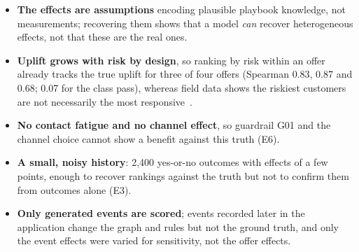 \begin{itemize}
  \item \textbf{The effects are assumptions} encoding plausible playbook knowledge, not measurements; recovering them shows that a model \emph{can} recover heterogeneous effects, not that these are the real ones.
  \item \textbf{Uplift grows with risk by design}, so ranking by risk within an offer already tracks the true uplift for three of four offers (Spearman 0.83, 0.87 and 0.68; 0.07 for the class pass), whereas field data shows the riskiest customers are not necessarily the most responsive~\cite{ascarza2018futility}.
  \item \textbf{No contact fatigue and no channel effect}, so guardrail G01 and the channel choice cannot show a benefit against this truth (E6).
  \item \textbf{A small, noisy history}: 2,400 yes-or-no outcomes with effects of a few points, enough to recover rankings against the truth but not to confirm them from outcomes alone (E3).
  \item \textbf{Only generated events are scored}; events recorded later in the application change the graph and rules but not the ground truth, and only the event effects were varied for sensitivity, not the offer effects.
\end{itemize}
